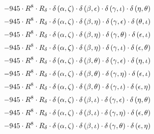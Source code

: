 \begin{subequations}
\begin{gather}
 \\[0.2em] \notag 		 - 945 \cdot R^{8} \cdot R_{\delta{}} \cdot \delta{}\left(\alpha{}, \zeta{}\right) \cdot \delta{}\left(\beta{}, \epsilon{}\right) \cdot \delta{}\left(\gamma{}, \iota{}\right) \cdot \delta{}\left(\eta{}, \theta{}\right) 
 \\[0.2em] \notag 		 - 945 \cdot R^{8} \cdot R_{\delta{}} \cdot \delta{}\left(\alpha{}, \zeta{}\right) \cdot \delta{}\left(\beta{}, \eta{}\right) \cdot \delta{}\left(\gamma{}, \epsilon{}\right) \cdot \delta{}\left(\theta{}, \iota{}\right) 
 \\[0.2em] \notag 		 - 945 \cdot R^{8} \cdot R_{\delta{}} \cdot \delta{}\left(\alpha{}, \zeta{}\right) \cdot \delta{}\left(\beta{}, \eta{}\right) \cdot \delta{}\left(\gamma{}, \theta{}\right) \cdot \delta{}\left(\epsilon{}, \iota{}\right) 
 \\[0.2em] \notag 		 - 945 \cdot R^{8} \cdot R_{\delta{}} \cdot \delta{}\left(\alpha{}, \zeta{}\right) \cdot \delta{}\left(\beta{}, \eta{}\right) \cdot \delta{}\left(\gamma{}, \iota{}\right) \cdot \delta{}\left(\epsilon{}, \theta{}\right) 
 \\[0.2em] \notag 		 - 945 \cdot R^{8} \cdot R_{\delta{}} \cdot \delta{}\left(\alpha{}, \zeta{}\right) \cdot \delta{}\left(\beta{}, \theta{}\right) \cdot \delta{}\left(\gamma{}, \epsilon{}\right) \cdot \delta{}\left(\eta{}, \iota{}\right) 
 \\[0.2em] \notag 		 - 945 \cdot R^{8} \cdot R_{\delta{}} \cdot \delta{}\left(\alpha{}, \zeta{}\right) \cdot \delta{}\left(\beta{}, \theta{}\right) \cdot \delta{}\left(\gamma{}, \eta{}\right) \cdot \delta{}\left(\epsilon{}, \iota{}\right) 
 \\[0.2em] \notag 		 - 945 \cdot R^{8} \cdot R_{\delta{}} \cdot \delta{}\left(\alpha{}, \zeta{}\right) \cdot \delta{}\left(\beta{}, \theta{}\right) \cdot \delta{}\left(\gamma{}, \iota{}\right) \cdot \delta{}\left(\epsilon{}, \eta{}\right) 
 \\[0.2em] \notag 		 - 945 \cdot R^{8} \cdot R_{\delta{}} \cdot \delta{}\left(\alpha{}, \zeta{}\right) \cdot \delta{}\left(\beta{}, \iota{}\right) \cdot \delta{}\left(\gamma{}, \epsilon{}\right) \cdot \delta{}\left(\eta{}, \theta{}\right) 
 \\[0.2em] \notag 		 - 945 \cdot R^{8} \cdot R_{\delta{}} \cdot \delta{}\left(\alpha{}, \zeta{}\right) \cdot \delta{}\left(\beta{}, \iota{}\right) \cdot \delta{}\left(\gamma{}, \eta{}\right) \cdot \delta{}\left(\epsilon{}, \theta{}\right) 
 \\[0.2em] \notag 		 - 945 \cdot R^{8} \cdot R_{\delta{}} \cdot \delta{}\left(\alpha{}, \zeta{}\right) \cdot \delta{}\left(\beta{}, \iota{}\right) \cdot \delta{}\left(\gamma{}, \theta{}\right) \cdot \delta{}\left(\epsilon{}, \eta{}\right) 

\end{gather}
\end{subequations}
